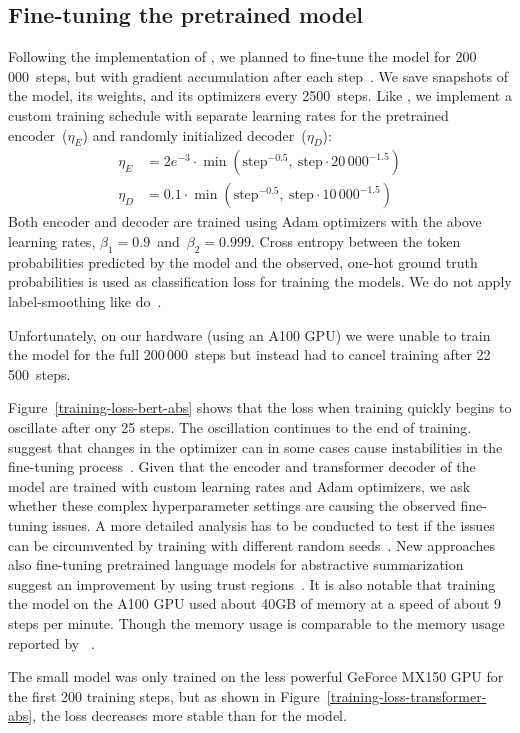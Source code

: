 \subsection{Fine-tuning the pretrained model}

Following the implementation of \cite{LiuL2019}, we planned to fine-tune the \BertSumAbs model for 200\,000~steps, but with gradient accumulation after each step~\cite{LiuL2019}. We save snapshots of the model, its weights, and its optimizers every 2500~steps.
Like \citeauthor{LiuL2019}, we implement a custom training schedule with separate learning rates for the pretrained encoder~(\(\eta_E\)) and randomly initialized decoder~(\(\eta_D\)):
\begin{align*}
    \eta_E &= 2e^{-3} \cdot \min( \text{step}^{-0.5},\ \text{step} \cdot 20\,000^{-1.5} ) \\
    \eta_D &= 0.1 \cdot \min( \text{step}^{-0.5},\ \text{step} \cdot 10\,000^{-1.5} )
\end{align*}
Both encoder and decoder are trained using Adam optimizers with the above learning rates, \(\beta_1 = 0.9\)~and~\(\beta_2 = 0.999\).
Cross entropy between the token probabilities predicted by the model and the observed, one-hot ground truth probabilities is used as classification loss for training the models. We do not apply label-smoothing like \citeauthor{LiuL2019} do~\cite{LiuL2019}.

Unfortunately, on our hardware (using an A100 GPU) we were unable to train the model for the full 200\,000~steps but instead had to cancel training after 22\,500~steps.

Figure~\ref{training-loss-bert-abs} shows that the loss when training \BertSumAbs quickly begins to oscillate after ony 25 steps. The oscillation continues to the end of training.
\citeauthor{ZhangWKWA2020} suggest that changes in the optimizer can in some cases cause instabilities in the fine-tuning process~\cite{ZhangWKWA2020}.
Given that the \Bert encoder and transformer decoder of the \BertSumAbs model are trained with custom learning rates and Adam optimizers, we ask whether these complex hyperparameter settings are causing the observed fine-tuning issues.
A more detailed analysis has to be conducted to test if the issues can be circumvented by training with different random seeds~\cite{DodgeISFHS2020}.
New approaches also fine-tuning pretrained language models for abstractive summarization suggest an improvement by using trust regions~\cite{AghajanyanSGGZG2020}.
It is also notable that training the \BertSumAbs model on the A100 GPU used about 40GB of memory at a speed of about 9 steps per minute.
Though the memory usage is comparable to the memory usage reported by \citeauthor{LiuL2019}~\cite{LiuL2019}.

The small \TransformerAbsTiny model was only trained on the less powerful GeForce MX150 GPU for the first 200 training steps, but as shown in Figure~\ref{training-loss-transformer-abs}, the loss decreases more stable than for the \BertSumAbs model.

